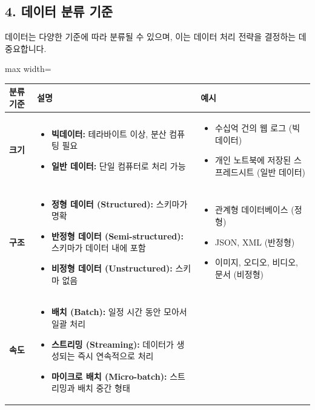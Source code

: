 \documentclass[11pt,a4paper]{article}
\begin{document}
\subsection*{4. 데이터 분류 기준}

데이터는 다양한 기준에 따라 분류될 수 있으며, 이는 데이터 처리 전략을 결정하는 데 중요합니다.

\begin{adjustbox}{max width=\textwidth}
\begin{tabular}{lll}
\toprule
\textbf{분류 기준} & \textbf{설명} & \textbf{예시} \\
\midrule
\textbf{크기} &
\begin{itemize}
    \item \textbf{빅데이터:} 테라바이트 이상, 분산 컴퓨팅 필요
    \item \textbf{일반 데이터:} 단일 컴퓨터로 처리 가능
\end{itemize} &
\begin{itemize}
    \item 수십억 건의 웹 로그 (빅데이터)
    \item 개인 노트북에 저장된 스프레드시트 (일반 데이터)
\end{itemize} \\
\textbf{구조} &
\begin{itemize}
    \item \textbf{정형 데이터 (Structured):} 스키마가 명확
    \item \textbf{반정형 데이터 (Semi-structured):} 스키마가 데이터 내에 포함
    \item \textbf{비정형 데이터 (Unstructured):} 스키마 없음
\end{itemize} &
\begin{itemize}
    \item 관계형 데이터베이스 (정형)
    \item JSON, XML (반정형)
    \item 이미지, 오디오, 비디오, 문서 (비정형)
\end{itemize} \\
\textbf{속도} &
\begin{itemize}
    \item \textbf{배치 (Batch):} 일정 시간 동안 모아서 일괄 처리
    \item \textbf{스트리밍 (Streaming):} 데이터가 생성되는 즉시 연속적으로 처리
    \item \textbf{마이크로 배치 (Micro-batch):} 스트리밍과 배치 중간 형태
\end{itemize} &
\begin{itemize}

\end{itemize}
\end{tabular}
\end{adjustbox}
\end{document}
